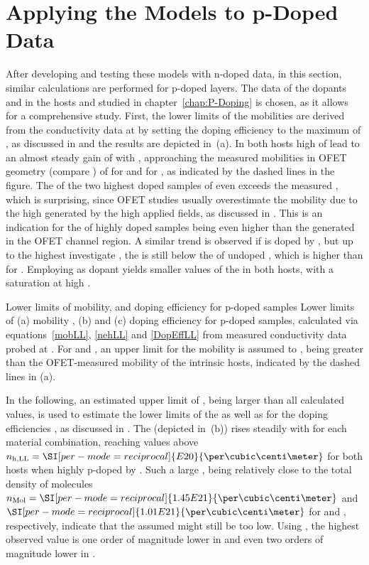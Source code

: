 \section{Applying the Models to p-Doped Data}\label{sec:rechApplyForP}
After developing and testing these models with n-doped data, in this section, similar calculations are performed for p-doped layers.
The data of the dopants \FS and \CSF in the hosts \meo and \lili studied in chapter~\ref{chap:P-Doping} is chosen, as it allows for a comprehensive study.
First, the lower limits of the mobilities \mobLL are derived from the conductivity data at \T[40] by setting the doping efficiency to the maximum of \DopEff[100], as discussed in  and the results are depicted in \,(a).
In both hosts high \CLongs of \FS lead to an almost steady gain of \mobLL with \C, approaching the measured mobilities in OFET geometry (compare ) of \mob[2.3E-05] for \meo and \mob[5.7E-05] for \lili, as indicated by the dashed lines in the figure. The \mobLL of the two highest doped samples of \meo even exceeds the measured \mob, which is surprising, since OFET studies usually overestimate the mobility due to the high \nLong generated by the high applied fields, as discussed in .
This is an indication for the \nh of highly doped samples being even higher than the \nh generated in the OFET channel region.
A similar trend is observed if \lili is doped by \FS, but up to the highest investigate \C, the \mobLL is still below the \mob of undoped \lili, which is higher than for \meo.
Employing \CSF as dopant yields smaller values of the \mobLL in both hosts, with a saturation at high \C.

{Lower limits of mobility, \nhLong and doping efficiency for p-doped samples}
{Lower limits of (a) mobility \mobLL, (b) \nhLong \nhLL and (c) doping efficiency \DopEffLL for p-doped samples, calculated via equations~\eqref{mobLL}, \eqref{nehLL} and \eqref{DopEffLL} from measured conductivity data probed at \T[40]. For \nhLL and \DopEffLL, an upper limit for the mobility is assumed to \mobUL[E-4], being greater than the OFET-measured mobility of the intrinsic hosts, indicated by the dashed lines in (a).
}%

In the following, an estimated upper limit of \mobUL[E-4], being larger than all calculated \mobLL values, is used to estimate the lower limits of the \nhLong \nhLL as well as for the doping efficiencies \DopEffLL, as discussed in . The \nhLL (depicted in \,(b)) rises steadily with \C for each material combination, reaching values above $\nhLL=\SI[per-mode=reciprocal]{E20}{\per\cubic\centi\meter}$ for both hosts when highly p-doped by \FS. Such a large \nhLL, being relatively close to the total density of molecules \mbox{$\nM=\SI[per-mode=reciprocal]{1.45E21}{\per\cubic\centi\meter}$} and $\SI[per-mode=reciprocal]{1.01E21}{\per\cubic\centi\meter}$ for \meo and \lili, respectively, indicate that the assumed \mobUL[E-4] might still be too low. Using \CSF, the highest observed value is one order of magnitude lower in \meo and even two orders of magnitude lower in \lili.

